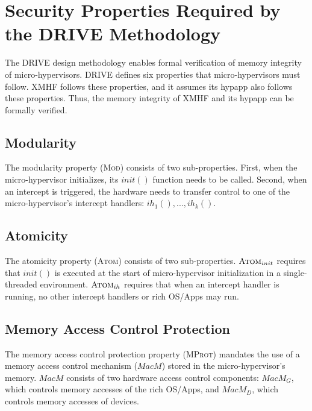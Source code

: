 \section{Security Properties Required by the \textsc{DRIVE} Methodology}
\label{sec:bg_drive}

The \textsc{DRIVE} design methodology \cite{vasudevan2013design} enables formal verification of memory integrity of micro-hypervisors. \textsc{DRIVE} defines six properties that micro-hypervisors must follow. XMHF follows these properties, and it assumes its hypapp also follows these properties. Thus, the memory integrity of XMHF and its hypapp can be formally verified.

\subsection{Modularity}
\label{subsec:bg_drive_mod}

The modularity property (\textsc{Mod}) consists of two sub-properties. First, when the micro-hypervisor initializes, its $init()$ function needs to be called. Second, when an intercept is triggered, the hardware needs to transfer control to one of the micro-hypervisor's intercept handlers: $ih_1(), ..., ih_k()$.

\subsection{Atomicity}
\label{subsec:bg_drive_atom}

The atomicity property (\textsc{Atom}) consists of two sub-properties. $\text{\textsc{Atom}}_{init}$ requires that $init()$ is executed at the start of micro-hypervisor initialization in a single-threaded environment. $\text{\textsc{Atom}}_{ih}$ requires that when an intercept handler is running, no other intercept handlers or rich OS/Apps may run.

\subsection{Memory Access Control Protection}
\label{subsec:bg_drive_mprot}

The memory access control protection property (\textsc{MProt}) mandates the use of a memory access control mechanism ($MacM$) stored in the micro-hypervisor's memory. $MacM$ consists of two hardware access control components: $MacM_G$, which controls memory accesses of the rich OS/Apps, and $MacM_D$, which controls memory accesses of devices.

